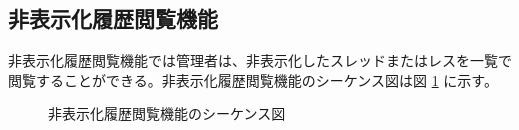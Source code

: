 \documentclass[a4j]{jarticle}
\begin{document}
 \subsection{非表示化履歴閲覧機能}
 非表示化履歴閲覧機能では管理者は、非表示化したスレッドまたはレスを一覧で閲覧することができる。非表示化履歴閲覧機能のシーケンス図は図 \ref{fig:admin_bbs_hide-history.png} に示す。
              \begin{figure}[H]
\centering
{}
\caption{非表示化履歴閲覧機能のシーケンス図}
\label{fig:admin_bbs_hide-history.png}
\end{figure}
\end{document}
